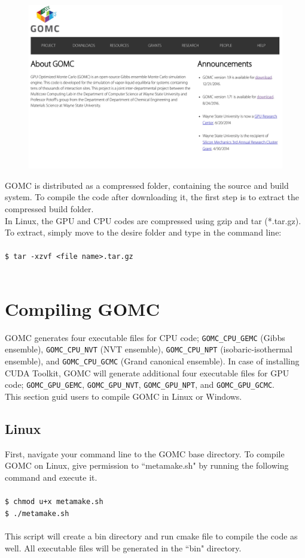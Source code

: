 \begin{figure}[H]
\centering
\includegraphics[scale=0.15]{images/website}
\end{figure}

GOMC is distributed as a compressed folder, containing the source and build system. To compile the code after downloading it, the first step is to extract the compressed build folder.\\
In Linux, the GPU and CPU codes are compressed using gzip and tar (*.tar.gz).  To extract, simply move to the desire folder and type in the command line:\\\\
\texttt{\$ tar -xzvf <file name>.tar.gz}\\\\

\section{Compiling GOMC}
GOMC generates four executable files for CPU code; \texttt{GOMC\_CPU\_GEMC} (Gibbs ensemble), \texttt{GOMC\_CPU\_NVT} (NVT ensemble), \texttt{GOMC\_CPU\_NPT} (isobaric-isothermal ensemble), and \texttt{GOMC\_CPU\_GCMC} (Grand canonical ensemble). In case of installing CUDA Toolkit, GOMC will generate additional four executable files for GPU code; \texttt{GOMC\_GPU\_GEMC}, \texttt{GOMC\_GPU\_NVT}, \texttt{GOMC\_GPU\_NPT}, and \texttt{GOMC\_GPU\_GCMC}. \\
This section guid users to compile GOMC in Linux or Windows.

\subsection{Linux}
First, navigate your command line to the GOMC base directory. To compile GOMC on Linux, give permission to ``metamake.sh" by running the following command and execute it.\\\\
\texttt{\$ chmod   u+x   metamake.sh}\\
\texttt{\$ ./metamake.sh}\\\\
This script will create a bin directory and run cmake file to compile the code as well. All executable files will be generated in the ``bin" directory.\\

